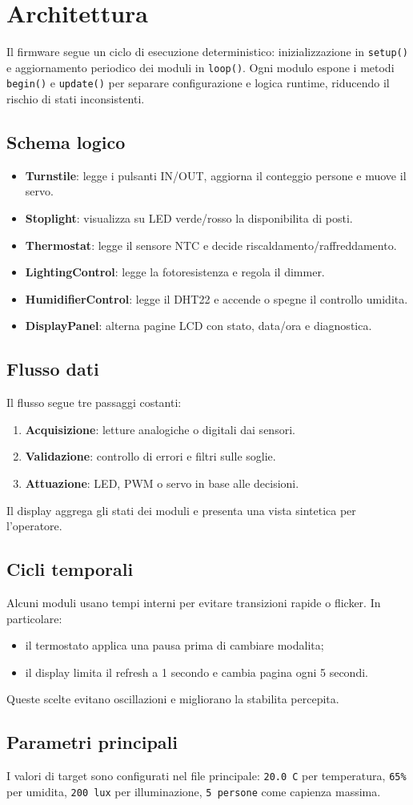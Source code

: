 \chapter{Architettura}

Il firmware segue un ciclo di esecuzione deterministico: inizializzazione in \texttt{setup()} e aggiornamento periodico dei moduli in \texttt{loop()}. Ogni modulo espone i metodi \texttt{begin()} e \texttt{update()} per separare configurazione e logica runtime, riducendo il rischio di stati inconsistenti.

\section{Schema logico}
\begin{itemize}
  \item \textbf{Turnstile}: legge i pulsanti IN/OUT, aggiorna il conteggio persone e muove il servo.
  \item \textbf{Stoplight}: visualizza su LED verde/rosso la disponibilita di posti.
  \item \textbf{Thermostat}: legge il sensore NTC e decide riscaldamento/raffreddamento.
  \item \textbf{LightingControl}: legge la fotoresistenza e regola il dimmer.
  \item \textbf{HumidifierControl}: legge il DHT22 e accende o spegne il controllo umidita.
  \item \textbf{DisplayPanel}: alterna pagine LCD con stato, data/ora e diagnostica.
\end{itemize}

\section{Flusso dati}
Il flusso segue tre passaggi costanti:
\begin{enumerate}
  \item \textbf{Acquisizione}: letture analogiche o digitali dai sensori.
  \item \textbf{Validazione}: controllo di errori e filtri sulle soglie.
  \item \textbf{Attuazione}: LED, PWM o servo in base alle decisioni.
\end{enumerate}
Il display aggrega gli stati dei moduli e presenta una vista sintetica per l'operatore.

\section{Cicli temporali}
Alcuni moduli usano tempi interni per evitare transizioni rapide o flicker. In particolare:
\begin{itemize}
  \item il termostato applica una pausa prima di cambiare modalita;
  \item il display limita il refresh a 1 secondo e cambia pagina ogni 5 secondi.
\end{itemize}
Queste scelte evitano oscillazioni e migliorano la stabilita percepita.

\section{Parametri principali}
I valori di target sono configurati nel file principale:\newline
\texttt{20.0 C} per temperatura, \texttt{65\%} per umidita, \texttt{200 lux} per illuminazione, \texttt{5 persone} come capienza massima.
